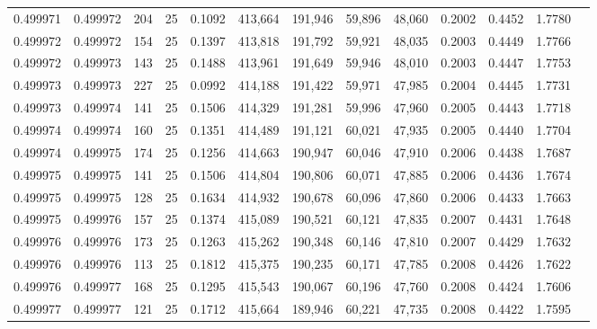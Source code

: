 \begin{tabular}{rrrrrrrrrrrrr}
0.499971 & 0.499972 & 204 &  25 &                                     0.1092 & 413,664 & 191,946 &  59,896 &  48,060 & 0.2002 & 0.4452 & 1.7780 \\
0.499972 & 0.499972 & 154 &  25 &                                     0.1397 & 413,818 & 191,792 &  59,921 &  48,035 & 0.2003 & 0.4449 & 1.7766 \\
0.499972 & 0.499973 & 143 &  25 &                                     0.1488 & 413,961 & 191,649 &  59,946 &  48,010 & 0.2003 & 0.4447 & 1.7753 \\
0.499973 & 0.499973 & 227 &  25 &                                     0.0992 & 414,188 & 191,422 &  59,971 &  47,985 & 0.2004 & 0.4445 & 1.7731 \\
0.499973 & 0.499974 & 141 &  25 &                                     0.1506 & 414,329 & 191,281 &  59,996 &  47,960 & 0.2005 & 0.4443 & 1.7718 \\
0.499974 & 0.499974 & 160 &  25 &                                     0.1351 & 414,489 & 191,121 &  60,021 &  47,935 & 0.2005 & 0.4440 & 1.7704 \\
0.499974 & 0.499975 & 174 &  25 &                                     0.1256 & 414,663 & 190,947 &  60,046 &  47,910 & 0.2006 & 0.4438 & 1.7687 \\
0.499975 & 0.499975 & 141 &  25 &                                     0.1506 & 414,804 & 190,806 &  60,071 &  47,885 & 0.2006 & 0.4436 & 1.7674 \\
0.499975 & 0.499975 & 128 &  25 &                                     0.1634 & 414,932 & 190,678 &  60,096 &  47,860 & 0.2006 & 0.4433 & 1.7663 \\
0.499975 & 0.499976 & 157 &  25 &                                     0.1374 & 415,089 & 190,521 &  60,121 &  47,835 & 0.2007 & 0.4431 & 1.7648 \\
0.499976 & 0.499976 & 173 &  25 &                                     0.1263 & 415,262 & 190,348 &  60,146 &  47,810 & 0.2007 & 0.4429 & 1.7632 \\
0.499976 & 0.499976 & 113 &  25 &                                     0.1812 & 415,375 & 190,235 &  60,171 &  47,785 & 0.2008 & 0.4426 & 1.7622 \\
0.499976 & 0.499977 & 168 &  25 &                                     0.1295 & 415,543 & 190,067 &  60,196 &  47,760 & 0.2008 & 0.4424 & 1.7606 \\
0.499977 & 0.499977 & 121 &  25 &                                     0.1712 & 415,664 & 189,946 &  60,221 &  47,735 & 0.2008 & 0.4422 & 1.7595 \\

\end{tabular}
